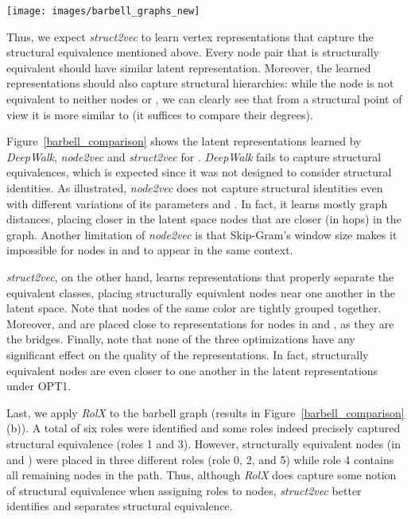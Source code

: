 \documentclass[sigconf]{acmart}
\begin{document}
\begin{figure*}[t]
\texttt{[image: images/barbell\_graphs\_new]}
\caption{(a) Barbell graph . (b) Roles identified by~\textit{RolX}. Latent representations in  learned by (c)~DeepWalk, (d)~\textit{node2vec} and (e,f,g,h)~\textit{struc2vec}. Parameters used for all methods: number of walks per node: 20, walk length: 80, skip-gram window size: 5. For \textit{node2vec}:  and .}
\label{barbell_comparison}
\end{figure*}

Thus, we expect \textit{struct2vec} to learn vertex representations that capture the structural equivalence mentioned above. Every node pair that is structurally equivalent should have similar latent representation. Moreover, the learned representations should also capture structural hierarchies: while the node  is not equivalent to neither nodes  or , we can clearly see that from a structural point of view it is more similar to  (it suffices to compare their degrees).

Figure~\ref{barbell_comparison} shows the latent representations learned by \textit{DeepWalk}, \textit{node2vec} and \textit{struct2vec} for . \textit{DeepWalk} fails to capture structural equivalences, which is expected since it was not designed to consider structural identities.
As illustrated, \textit{node2vec} does not capture structural identities even with different variations of its parameters  and . In fact, it learns mostly graph distances, placing closer in the latent space nodes that are closer (in hops) in the graph. Another limitation of \textit{node2vec} is that Skip-Gram's window size makes it impossible for nodes in  and  to appear in the same context.

\textit{struct2vec}, on the other hand, learns representations that properly separate the equivalent classes, placing structurally equivalent nodes near one another in the latent space. Note that nodes of the same color are tightly grouped together. Moreover,  and  are placed close to representations for nodes in  and , as they are the bridges. Finally, note that none of the three optimizations have any significant effect on the quality of the representations. In fact, structurally equivalent nodes are even closer to one another in the latent representations under OPT1. 

Last, we apply \textit{RolX} to the barbell graph (results in Figure~\ref{barbell_comparison}(b)). A total of six roles were identified and some roles indeed precisely captured structural equivalence (roles 1 and 3). However, structurally equivalent nodes (in  and ) were placed in three different roles (role 0, 2, and 5) while role 4 contains all remaining nodes in the path. Thus, although \textit{RolX} does capture some notion of structural equivalence when assigning roles to nodes, \textit{struct2vec} better identifies and separates structural equivalence. 
\end{document}
